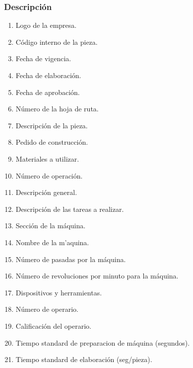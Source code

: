 \subsubsection{Descripción}
\begin{enumerate}
 \item Logo de la empresa.
 \item C\'odigo interno de la pieza.
 \item Fecha de vigencia.
 \item Fecha de elaboraci\'on.
 \item Fecha de aprobaci\'on.
 \item Número de la hoja de ruta.
 \item Descripci\'on de la pieza.
 \item Pedido de construcci\'on.
 \item Materiales a utilizar.
 \item N\'umero de operaci\'on.
 \item Descripci\'on general.
 \item Descripci\'on de las tareas a realizar.
 \item Secci\'on de la m\'aquina. 
 \item Nombre de la m'aquina.
 \item N\'umero de pasadas por la m\'aquina.
 \item N\'umero de revoluciones por minuto para la m\'aquina.
 \item Dispositivos y herramientas.
 \item N\'umero de operario.
 \item Calificaci\'on del operario.
 \item Tiempo standard de preparacion de m\'aquina (segundos).
 \item Tiempo standard de elaboraci\'on (seg/pieza).
\end{enumerate}


\pagebreak
